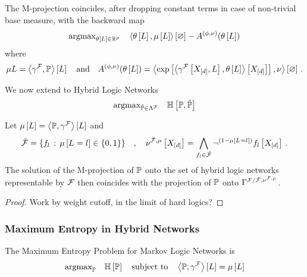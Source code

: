 The M-projection coincides, after dropping constant terms in case of non-trivial base measure, with the backward map
\begin{align*}
	\mathrm{argmax}_{\theta\left[L\right]\in\mathbb{R}^{p}} \quad 
	\left\langle \theta\left[L\right],\mu\left[L\right]\right\rangle \left[ \varnothing \right] - A^{(\phi,\nu)}(\theta\left[L\right]) 
\end{align*}
where
\begin{align*}
	\mu{L} 
	= \left\langle \gamma^{\mathcal{F}},\mathbb{P}\right\rangle \left[ L \right] 
	\quad \text{and} \quad
	A^{(\phi,\nu)}(\theta\left[L\right]) 
	= \left\langle \mathrm{exp}\left[ \left\langle \gamma^{\mathcal{F}}\left[X_{[d]},L\right],\theta\left[L\right]\right\rangle \left[ X_{[d]} \right] \right], \nu\right\rangle \left[ \varnothing \right] \, . 
\end{align*}


We now extend to Hybrid Logic Networks
\begin{align*}
	\mathrm{argmax}_{\tilde{\mathbb{P}}\in\Lambda^{\mathcal{F}}} \quad 
	\mathbb{H}\left[\mathbb{P},\tilde{\mathbb{P}}\right]	
\end{align*}

\begin{theorem}
	Let $\mu\left[L\right] = \left\langle \mathbb{P},\gamma^{\mathcal{F}}\right\rangle \left[ L \right]$ and
		\[ \tilde{\mathcal{F}} = \{f_{l} \, : \, \mu\left[L_{}=l_{}\right] \in \{0,1\}\} \quad , \quad 
		\nu^{\tilde{\mathcal{F}},\mu}\left[X_{[d]}\right] 
		= \bigwedge_{f_{l}\in\tilde{\mathcal{F}}} \lnot^{(1-\mu\left[L_{}=l_{}\right])} f_{l}\left[X_{[d]}\right]
		\, . \]
	The solution of the M-projection of $\mathbb{P}$ onto the set of hybrid logic networks representable by $\mathcal{F}$ then coincides with the projection of $\mathbb{P}$ onto $\Gamma^{\mathcal{F}/\tilde{\mathcal{F}},\nu^{\tilde{\mathcal{F}},\mu}}$.
\end{theorem}
\begin{proof}
	Work by weight cutoff, in the limit of hard logics?
\end{proof}

\subsubsection{Maximum Entropy in Hybrid Networks}


The Maximum Entropy Problem for Markov Logic Networks is
\begin{align}
	\mathrm{argmax}_{\mathbb{P}} \quad \mathbb{H}\left[\mathbb{P}\right] 
	\quad \text{subject to} \quad  
	\left\langle \mathbb{P},\gamma^{\mathcal{F}}\right\rangle \left[ L \right]
	 =  \mu\left[L\right] 
\end{align}



